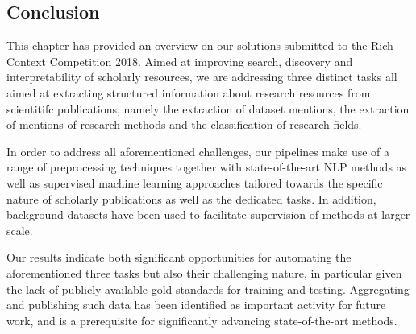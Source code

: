 \subsection{Conclusion}
\label{sec:conclusion}
This chapter has provided an overview on our solutions submitted to the Rich Context Competition 2018. Aimed at improving search, discovery and interpretability of scholarly resources, we are addressing three distinct tasks all aimed at extracting structured information about research resources from scientitifc publications, namely the extraction of dataset mentions, the extraction of mentions of research methods and the classification of research fields. 

In order to address all aforementioned challenges, our pipelines make use of a range of preprocessing techniques together with state-of-the-art NLP methods as well as supervised machine learning approaches tailored towards the specific nature of scholarly publications as well as the dedicated tasks. In addition, background datasets have been used to facilitate supervision of methods at larger scale.

Our results indicate both significant opportunities for automating the aforementioned three tasks but also their challenging nature, in particular given the lack of publicly available gold standards for training and testing. Aggregating and publishing such data has been identified as important activity for future work, and is a prerequisite for significantly advancing state-of-the-art methods.

